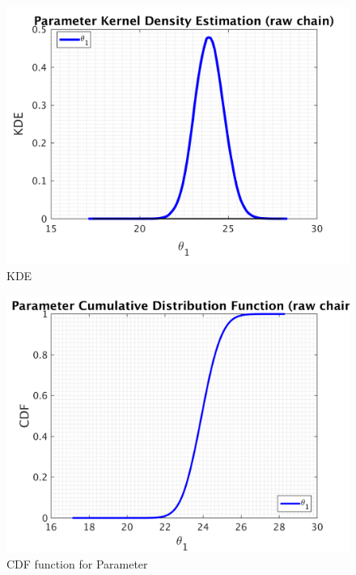 \clearpage

\begin{figure}[H]
  
  \centering
   \includegraphics[scale=0.75]{100_results/outputData_300000/simple_ip_kde_raw}
   \caption{ KDE }
\end{figure}

\begin{figure}[H]
  
  \centering
   \includegraphics[scale=0.75]{100_results/outputData_300000/simple_ip_cdf_raw}
   \caption{CDF function for Parameter }
\end{figure}



